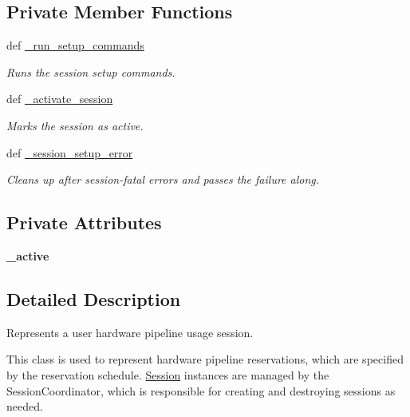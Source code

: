 \subsection*{Private Member Functions}
\begin{DoxyCompactItemize}
\item 
def \hyperlink{classhwm_1_1sessions_1_1session_1_1_session_ae15ea5f2fb1f9fc941d566ba1a1fa717}{\-\_\-run\-\_\-setup\-\_\-commands}
\begin{DoxyCompactList}\small\item\em Runs the session setup commands. \end{DoxyCompactList}\item 
def \hyperlink{classhwm_1_1sessions_1_1session_1_1_session_a0f1ed6e582009b9e7e1bf1bb48e92ca2}{\-\_\-activate\-\_\-session}
\begin{DoxyCompactList}\small\item\em Marks the session as active. \end{DoxyCompactList}\item 
def \hyperlink{classhwm_1_1sessions_1_1session_1_1_session_a705fbbf0404ebe64170cef1a1ac6fd86}{\-\_\-session\-\_\-setup\-\_\-error}
\begin{DoxyCompactList}\small\item\em Cleans up after session-\/fatal errors and passes the failure along. \end{DoxyCompactList}\end{DoxyCompactItemize}
\subsection*{Private Attributes}
\begin{DoxyCompactItemize}
\item 
\hypertarget{classhwm_1_1sessions_1_1session_1_1_session_ad86f3d3182ae07468717bd82c6af449a}{{\bfseries \-\_\-active}}\label{classhwm_1_1sessions_1_1session_1_1_session_ad86f3d3182ae07468717bd82c6af449a}

\end{DoxyCompactItemize}


\subsection{Detailed Description}
Represents a user hardware pipeline usage session. 

This class is used to represent hardware pipeline reservations, which are specified by the reservation schedule. \hyperlink{classhwm_1_1sessions_1_1session_1_1_session}{Session} instances are managed by the Session\-Coordinator, which is responsible for creating and destroying sessions as needed. 

